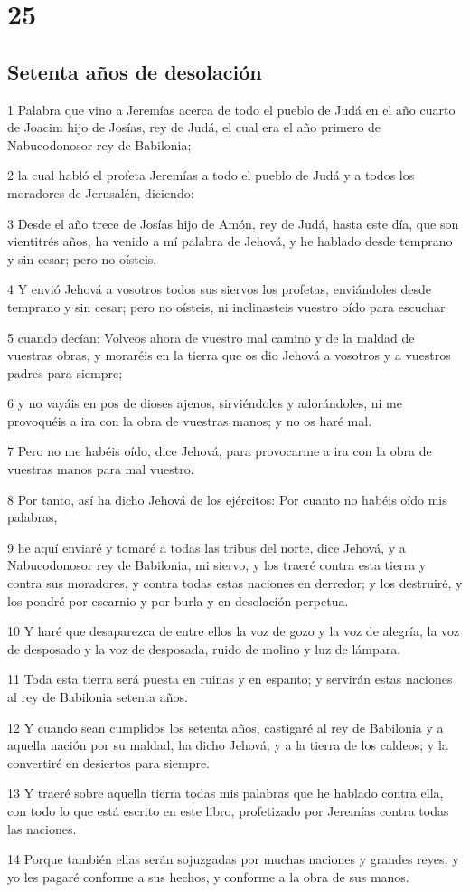 \chapter{25}

\section*{Setenta años de desolación}

\par 1 Palabra que vino a Jeremías acerca de todo el pueblo de Judá en el año cuarto de Joacim hijo de Josías, rey de Judá, el cual era el año primero de Nabucodonosor rey de Babilonia;
\par 2 la cual habló el profeta Jeremías a todo el pueblo de Judá y a todos los moradores de Jerusalén, diciendo:
\par 3 Desde el año trece de Josías hijo de Amón, rey de Judá, hasta este día, que son vientitrés años, ha venido a mí palabra de Jehová, y he hablado desde temprano y sin cesar; pero no oísteis.
\par 4 Y envió Jehová a vosotros todos sus siervos los profetas, enviándoles desde temprano y sin cesar; pero no oísteis, ni inclinasteis vuestro oído para escuchar
\par 5 cuando decían: Volveos ahora de vuestro mal camino y de la maldad de vuestras obras, y moraréis en la tierra que os dio Jehová a vosotros y a vuestros padres para siempre;
\par 6 y no vayáis en pos de dioses ajenos, sirviéndoles y adorándoles, ni me provoquéis a ira con la obra de vuestras manos; y no os haré mal.
\par 7 Pero no me habéis oído, dice Jehová, para provocarme a ira con la obra de vuestras manos para mal vuestro.
\par 8 Por tanto, así ha dicho Jehová de los ejércitos: Por cuanto no habéis oído mis palabras,
\par 9 he aquí enviaré y tomaré a todas las tribus del norte, dice Jehová, y a Nabucodonosor rey de Babilonia, mi siervo, y los traeré contra esta tierra y contra sus moradores, y contra todas estas naciones en derredor; y los destruiré, y los pondré por escarnio y por burla y en desolación perpetua.
\par 10 Y haré que desaparezca de entre ellos la voz de gozo y la voz de alegría, la voz de desposado y la voz de desposada, ruido de molino y luz de lámpara. 
\par 11 Toda esta tierra será puesta en ruinas y en espanto; y servirán estas naciones al rey de Babilonia setenta años. 
\par 12 Y cuando sean cumplidos los setenta años, castigaré al rey de Babilonia y a aquella nación por su maldad, ha dicho Jehová, y a la tierra de los caldeos; y la convertiré en desiertos para siempre.
\par 13 Y traeré sobre aquella tierra todas mis palabras que he hablado contra ella, con todo lo que está escrito en este libro, profetizado por Jeremías contra todas las naciones.
\par 14 Porque también ellas serán sojuzgadas por muchas naciones y grandes reyes; y yo les pagaré conforme a sus hechos, y conforme a la obra de sus manos.

